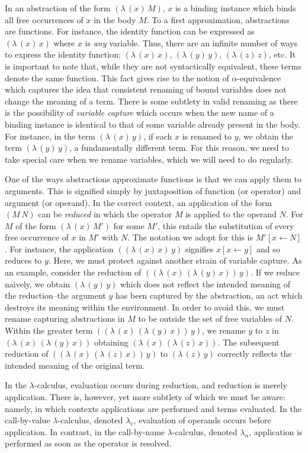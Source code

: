 \documentclass[ms,electronic,twosidetoc,letterpaper,chaptercenter,parttop]{byumsphd}
\newcommand{\lc}{$\lambda$-calculus}
\newcommand{\lv}{$\lambda_v$}
\newcommand{\la}{$\lambda_n$}
\newcommand{\abs}[2]{(\lambda\,(#1)\,#2)}
\newcommand{\app}[2]{(#1\,#2)}
\begin{document}
In an abstraction of the form $\abs{x}{M}$, $x$ is a binding instance which binds all free
occurrences of $x$ in the body $M$. To a first approximation, abstractions are functions.
For instance, the identity function can be expressed as $\abs{x}{x}$ where $x$ is
\emph{any} variable. Thus, there are an infinite number of ways to express the identity
function: $\abs{x}{x}$, $\abs{y}{y}$, $\abs{z}{z}$, etc. It is important to note that,
while they are not syntactically equivalent, these terms denote the same function. This
fact gives rise to the notion of $\alpha$-equivalence which captures the idea that
consistent renaming of bound variables does not change the meaning of a term. There is
some subtlety in valid renaming as there is the possibility of \emph{variable capture}
which occurs when the new name of a binding instance is identical to that of some variable
already present in the body. For instance, in the term $\abs{x}{y}$, if each $x$ is
renamed to $y$, we obtain the term $\abs{y}{y}$, a fundamentally different term. For this
reason, we need to take special care when we rename variables, which we will need to do
regularly.

One of the ways abstractions approximate functions is that we can apply them to arguments.
This is signified simply by juxtaposition of function (or operator) and argument (or
operand). In the correct context, an application of the form $\app{M}{N}$ can be
\emph{reduced} in which the operator $M$ is applied to the operand $N$. For $M$ of the
form $\abs{x}{M'}$ for some $M'$, this entails the substitution of every free occurrence
of $x$ in $M'$ with $N$. The notation we adopt for this is $M'[x\leftarrow N]$. For
instance, the application $\app{\abs{x}{x}}{y}$ signifies $x[x\leftarrow y]$ and so
reduces to $y$. Here, we must protect against another strain of variable capture. As an
example, consider the reduction of $\app{\abs{x}{\abs{y}{x}}}{y}$. If we reduce naively,
we obtain $\abs{y}{y}$ which does not reflect the intended meaning of the reduction--the
argument $y$ has been captured by the abstraction, an act which destroys its meaning
within the environment. In order to avoid this, we must rename capturing abstractions in
$M$ to be outside the set of free variables of $N$. Within the greater term
$\app{\abs{x}{\abs{y}{x}}}{y}$, we rename $y$ to $z$ in $\abs{x}{\abs{y}{x}}$ obtaining
$\abs{x}{\abs{z}{x}}$. The subsequent reduction of $\app{\abs{x}{\abs{z}{x}}}{y}$ to
$\abs{z}{y}$ correctly reflects the intended meaning of the original term.

In the \lc, evaluation occurs during reduction, and reduction is merely application. There
is, however, yet more subtlety of which we must be aware: namely, in which contexts
applications are performed and terms evaluated. In the call-by-value \lc, denoted \lv,
evaluation of operands occurs before application. In contrast, in the call-by-name \lc,
denoted \la, application is performed as soon as the operator is resolved.
\end{document}
